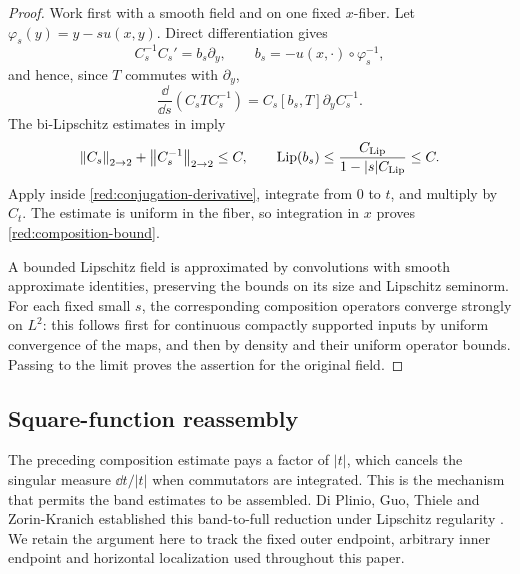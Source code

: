 \begin{proof}
Work first with a smooth field and on one fixed \(x\)-fiber.
Let \(\varphi_s(y)=y-su(x,y)\). Direct differentiation gives
\[
 C_s^{-1}C_s'=b_s\partial_y,
 \qquad b_s=-u(x,\cdot)\circ\varphi_s^{-1},
\]
and hence, since \(T\) commutes with \(\partial_y\),
\begin{equation}\label{red:conjugation-derivative}
 \frac{\dd}{\dd s}(C_sTC_s^{-1})
       =C_s[b_s,T]\partial_y C_s^{-1}.
\end{equation}
The bi-Lipschitz estimates in  imply
\[
 \left\|C_s\right\|_{2\to2}+\left\|C_s^{-1}\right\|_{2\to2}\le C,
 \qquad
 \operatorname{Lip}(b_s)\le
    \frac{C_{\rm Lip}}{1-|s|C_{\rm Lip}}\le C.
\]
Apply  inside
\eqref{red:conjugation-derivative}, integrate from \(0\) to \(t\),
and multiply by \(C_t\). The estimate is uniform in the fiber, so
integration in \(x\) proves \eqref{red:composition-bound}.

A bounded Lipschitz field is approximated by convolutions with smooth
approximate identities, preserving the bounds on its size and
Lipschitz seminorm. For each fixed small \(s\), the corresponding
composition operators converge strongly on \(L^2\): this follows
first for continuous compactly supported inputs by uniform
convergence of the maps, and then by density and their uniform
operator bounds. Passing to the limit proves the assertion for the
original field.
\end{proof}

\subsection{Square-function reassembly}

The preceding composition estimate pays a factor of \(|t|\), which
cancels the singular measure \(\dd t/|t|\) when commutators are
integrated. This is the mechanism that permits the band estimates to
be assembled. Di Plinio, Guo, Thiele and Zorin-Kranich established
this band-to-full reduction under Lipschitz regularity
\cite[Corollaries~1.3--1.4 of the author version]{DiPlinioGuoThieleZorinKranich2018}.
We retain the argument here to track the fixed outer endpoint,
arbitrary inner endpoint and horizontal localization used throughout
this paper.


